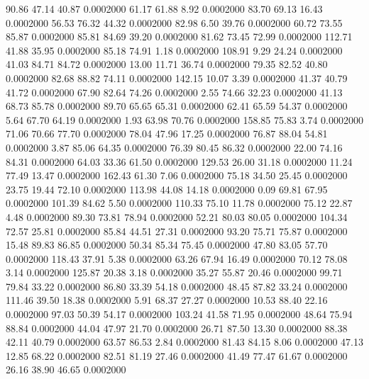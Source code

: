   90.86   47.14   40.87   0.0002000
  61.17   61.88    8.92   0.0002000
  83.70   69.13   16.43   0.0002000
  56.53   76.32   44.32   0.0002000
  82.98    6.50   39.76   0.0002000
  60.72   73.55   85.87   0.0002000
  85.81   84.69   39.20   0.0002000
  81.62   73.45   72.99   0.0002000
 112.71   41.88   35.95   0.0002000
  85.18   74.91    1.18   0.0002000
 108.91    9.29   24.24   0.0002000
  41.03   84.71   84.72   0.0002000
  13.00   11.71   36.74   0.0002000
  79.35   82.52   40.80   0.0002000
  82.68   88.82   74.11   0.0002000
 142.15   10.07    3.39   0.0002000
  41.37   40.79   41.72   0.0002000
  67.90   82.64   74.26   0.0002000
   2.55   74.66   32.23   0.0002000
  41.13   68.73   85.78   0.0002000
  89.70   65.65   65.31   0.0002000
  62.41   65.59   54.37   0.0002000
   5.64   67.70   64.19   0.0002000
   1.93   63.98   70.76   0.0002000
 158.85   75.83    3.74   0.0002000
  71.06   70.66   77.70   0.0002000
  78.04   47.96   17.25   0.0002000
  76.87   88.04   54.81   0.0002000
   3.87   85.06   64.35   0.0002000
  76.39   80.45   86.32   0.0002000
  22.00   74.16   84.31   0.0002000
  64.03   33.36   61.50   0.0002000
 129.53   26.00   31.18   0.0002000
  11.24   77.49   13.47   0.0002000
 162.43   61.30    7.06   0.0002000
  75.18   34.50   25.45   0.0002000
  23.75   19.44   72.10   0.0002000
 113.98   44.08   14.18   0.0002000
   0.09   69.81   67.95   0.0002000
 101.39   84.62    5.50   0.0002000
 110.33   75.10   11.78   0.0002000
  75.12   22.87    4.48   0.0002000
  89.30   73.81   78.94   0.0002000
  52.21   80.03   80.05   0.0002000
 104.34   72.57   25.81   0.0002000
  85.84   44.51   27.31   0.0002000
  93.20   75.71   75.87   0.0002000
  15.48   89.83   86.85   0.0002000
  50.34   85.34   75.45   0.0002000
  47.80   83.05   57.70   0.0002000
 118.43   37.91    5.38   0.0002000
  63.26   67.94   16.49   0.0002000
  70.12   78.08    3.14   0.0002000
 125.87   20.38    3.18   0.0002000
  35.27   55.87   20.46   0.0002000
  99.71   79.84   33.22   0.0002000
  86.80   33.39   54.18   0.0002000
  48.45   87.82   33.24   0.0002000
 111.46   39.50   18.38   0.0002000
   5.91   68.37   27.27   0.0002000
  10.53   88.40   22.16   0.0002000
  97.03   50.39   54.17   0.0002000
 103.24   41.58   71.95   0.0002000
  48.64   75.94   88.84   0.0002000
  44.04   47.97   21.70   0.0002000
  26.71   87.50   13.30   0.0002000
  88.38   42.11   40.79   0.0002000
  63.57   86.53    2.84   0.0002000
  81.43   84.15    8.06   0.0002000
  47.13   12.85   68.22   0.0002000
  82.51   81.19   27.46   0.0002000
  41.49   77.47   61.67   0.0002000
  26.16   38.90   46.65   0.0002000
